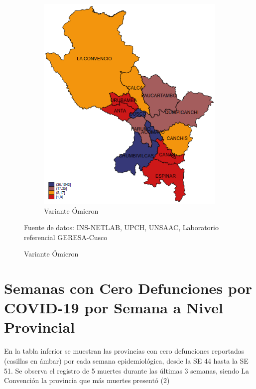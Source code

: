 \documentclass[12pt,a4paper,openany]{book}
\begin{document}
\begin{figure}[h]
\begin{subfigure}[b]{0.40\textwidth}
			\includegraphics[width=\textwidth]{../figuras/variantes_provincial_omicron.png}
			\caption{Variante Ómicron}
		\end{subfigure}
	{\footnotesize {Fuente de datos: INS-NETLAB, UPCH, UNSAAC, Laboratorio referencial GERESA-Cusco}}
	\end{figure}
	
	\clearpage
	
	
	
	\clearpage
	\section*{Semanas con Cero Defunciones por COVID-19 por Semana a Nivel Provincial}
	
	\noindent En la tabla inferior se muestran las provincias con cero defunciones reportadas (casillas en ámbar) por cada semana epidemiológica, desde la SE 44 hasta la SE 51. Se observa el registro de 5 muertes durante las últimas 3 semanas, siendo La Convención la provincia que más muertes presentó (2)
	
\end{document}
